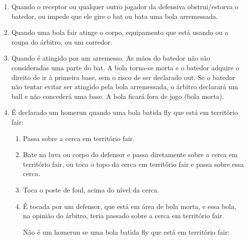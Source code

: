 \begin{multicols}{2}
\begin{enumerate}[label=\alph*)]
\begin{enumerate}[label=\roman*.]
\begin{enumerate}[label=\arabic*)]
				\item A bola torna-se morta e os corredores n\~ao podem avan\c{c}ar, a menos que sejam for\c{c}ados. 
			\end{enumerate}
		\end{enumerate}
		\item  Quando o receptor ou qualquer outro jogador da defensiva obstrui/estorva o batedor, ou impede que ele gire o \gls{bat} ou bata uma bola arremessada. 
		
		\item  Quando uma bola \gls{fair} atinge o corpo, equipamento que est\'a usando ou a roupa do \'arbitro, ou um corredor. 
		
		\item  Quando \'e atingido por um arremesso. As m\~aos do batedor n\~ao s\~ao consideradas uma parte do \gls{bat}. A bola torna-se morta e o batedor adquire o direito de ir \`a primeira base, sem o risco de ser declarado \gls{out}. Se o batedor n\~ao tentar evitar ser atingido pela bola arremessada, o \'arbitro declarar\'a um \gls{ball} e n\~ao conceder\'a uma base. A bola ficar\'a fora de jogo (bola morta). 
		
		\item  \'E declarado um \gls{homerun} quando uma bola batida \gls{fly} que est\'a em territ\'orio \gls{fair}: 
		
		\begin{enumerate}[label=\roman*.]
			\item  Passa sobre a cerca em territ\'orio \gls{fair}. 
			\item  Bate na luva ou corpo do defensor e passa diretamente sobre a cerca em territ\'orio \gls{fair}, ou toca o topo da cerca em territ\'orio \gls{fair} e passa sobre essa cerca. 
			\item  Toca o poste de \gls{foul}, acima do n\'ivel da cerca. 
			\item \'E tocada por um defensor, que est\'a em \'area de bola morta, e essa bola, na  opini\~ao do \'arbitro, teria passado sobre a cerca em territ\'orio \gls{fair}.
			
			N\~ao \'e um \gls{homerun} se uma bola batida \gls{fly} que est\'a em territ\'orio \gls{fair}: 
			

\end{enumerate}
\end{enumerate}
\end{multicols}
